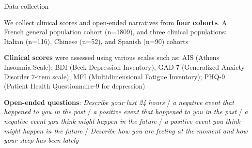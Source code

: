 \documentclass[handout,10pt]{beamer}
\begin{document}
\begin{frame}{Data collection}

We collect clinical scores and open-ended narratives from \textbf{four cohorts}. A French general population cohort (n=1809), and three clinical populations: Italian (n=116), Chinese (n=52), and Spanish (n=90) cohorts%

\vspace{0.5cm}
\pause

\textbf{Clinical scores} were assessed using various scales such as: AIS (Athens Insomnia Scale); BDI (Beck Depression Inventory); GAD-7 (Generalized Anxiety Disorder 7-item scale); MFI (Multidimensional Fatigue Inventory); PHQ-9 (Patient Health Questionnaire-9 for depression)

\vspace{0.5cm}
\pause

\textbf{Open-ended questions}: \textit{Describe your last 24 hours} / \textit{a negative event that happened to you in the past} / \textit{a positive event that happened to you in the past} / \textit{a negative event you think might happen in the future} / \textit{a positive event you think might happen in the future} / \textit{Describe how you are feeling at the moment and how your sleep has been lately}

\end{frame}
\end{document}
